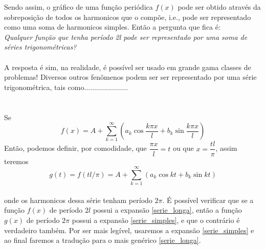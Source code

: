 Sendo assim, o gráfico de uma função periódica $f(x)$ pode ser obtido através da 
sobreposição de todos os harmonicos que o compõe, i.e., pode ser representado
como uma soma de harmonicos simples.
Então a pergunta que fica é:\\
\textit{Qualquer função que tenha período 2l pode ser representado por uma soma de séries 
trigonométricas?}\\
\\
A resposta é sim, na realidade, é possível ser usado em grande gama classes de problemas!
Diversos outros fenômenos podem ser ser representado por uma série trigonométrica,
tais como......................\\ 
\\
\\  
Se\\
\begin{equation}
\label{serie_longa}
    f(x) = A + \sum\limits_{k=1}^{\infty}(a_k\cos{\dfrac{k\pi x}{l}} + b_k\sin{\dfrac{k\pi x}{l}})
\end{equation}
Então, podemos definir, por comodidade, que $\dfrac{\pi x}{l} = t$ ou que $x = \dfrac{tl}{\pi}$,
assim teremos\\
\begin{equation}
\label{serie_simples}
    g(t) = f(tl/\pi) = A + \sum\limits_{k=1}^{\infty}(a_k\cos{kt} + b_k\sin{kt})
\end{equation}
\\
onde os harmonicos dessa série tenham período $2\pi$. É possível verificar que 
se a função $f(x)$ de período $2l$ possui a expansão \ref{serie_longa}, então
a função $g(x)$ de período $2\pi$ possui a expansão \ref{serie_simples}, e que
o contrário é verdadeiro também. Por ser mais legível, usaremos a expansão 
\ref{serie_simples} e ao final faremos a tradução para o mais genérico 
\ref{serie_longa}.\\